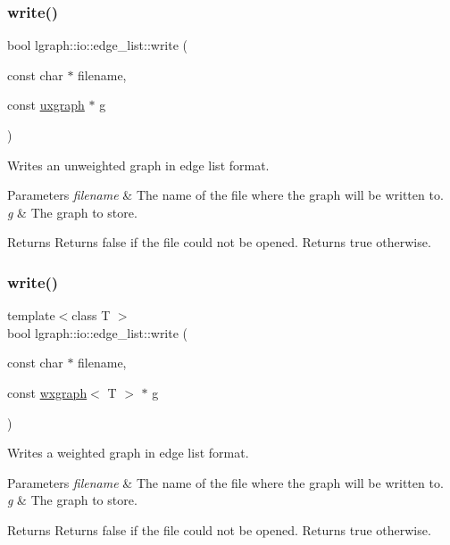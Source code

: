 \subsubsection{\texorpdfstring{write()}{write()}\hspace{0.1cm}{\footnotesize\ttfamily [3/4]}}
{\footnotesize\ttfamily bool lgraph\+::io\+::edge\+\_\+list\+::write (\begin{DoxyParamCaption}\item[{const char $\ast$}]{filename,  }\item[{const \hyperlink{classlgraph_1_1uxgraph}{uxgraph} $\ast$}]{g }\end{DoxyParamCaption})}



Writes an unweighted graph in edge list format. 


\begin{DoxyParams}{Parameters}
{\em filename} & The name of the file where the graph will be written to. \\
\hline
{\em g} & The graph to store. \\
\hline
\end{DoxyParams}
\begin{DoxyReturn}{Returns}
Returns false if the file could not be opened. Returns true otherwise. 
\end{DoxyReturn}
\mbox{\label{namespacelgraph_1_1io_1_1edge__list_ab8a0f64a5850e4c9741fcb2fc53646b7}} 
\subsubsection{\texorpdfstring{write()}{write()}\hspace{0.1cm}{\footnotesize\ttfamily [4/4]}}
{\footnotesize\ttfamily template$<$class T $>$ \\
bool lgraph\+::io\+::edge\+\_\+list\+::write (\begin{DoxyParamCaption}\item[{const char $\ast$}]{filename,  }\item[{const \hyperlink{classlgraph_1_1wxgraph}{wxgraph}$<$ T $>$ $\ast$}]{g }\end{DoxyParamCaption})}



Writes a weighted graph in edge list format. 


\begin{DoxyParams}{Parameters}
{\em filename} & The name of the file where the graph will be written to. \\
\hline
{\em g} & The graph to store. \\
\hline
\end{DoxyParams}
\begin{DoxyReturn}{Returns}
Returns false if the file could not be opened. Returns true otherwise. 
\end{DoxyReturn}

